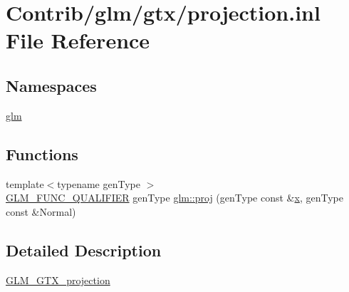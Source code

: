 \hypertarget{projection_8inl}{}\section{Contrib/glm/gtx/projection.inl File Reference}
\label{projection_8inl}
\subsection*{Namespaces}
\begin{DoxyCompactItemize}
\item 
 \mbox{\hyperlink{namespaceglm}{glm}}
\end{DoxyCompactItemize}
\subsection*{Functions}
\begin{DoxyCompactItemize}
\item 
{\footnotesize template$<$typename gen\+Type $>$ }\\\mbox{\hyperlink{setup_8hpp_a33fdea6f91c5f834105f7415e2a64407}{G\+L\+M\+\_\+\+F\+U\+N\+C\+\_\+\+Q\+U\+A\+L\+I\+F\+I\+ER}} gen\+Type \mbox{\hyperlink{group__gtx__projection_ga58384b7170801dd513de46f87c7fb00e}{glm\+::proj}} (gen\+Type const \&\mbox{\hyperlink{_s_d_l__opengl_8h_ad0e63d0edcdbd3d79554076bf309fd47}{x}}, gen\+Type const \&Normal)
\end{DoxyCompactItemize}


\subsection{Detailed Description}
\mbox{\hyperlink{group__gtx__projection}{G\+L\+M\+\_\+\+G\+T\+X\+\_\+projection}} 